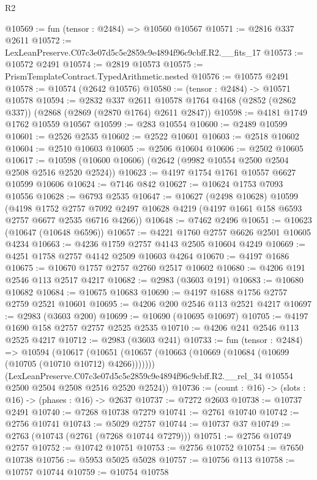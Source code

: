 \begin{lexlean}{R2}
\begin{coremodule}
@10569 := fun (tensor : @2484) => @10560 @10567
@10571 := @2816 @337 @2611
@10572 := LexLeanPreserve.C07c3e07d5c5e2859c9e4894f96c9cbff.R2.__fits_17
@10573 := @10572 @2491
@10574 := @2819 @10573
@10575 := PrismTemplateContract.TypedArithmetic.nested
@10576 := @10575 @2491
@10578 := @10574 (@2642 @10576)
@10580 := (tensor : @2484) -> @10571 @10578
@10594 := @2832
    @337
    @2611
    @10578
    @1764
    @4168
    (@2852 (@2862 @337))
    (@2868 (@2869 (@2870 @1764) @2611 @2847))
@10598 := @4181 @1749 @1762 @10559 @10567
@10599 := @283 @10554
@10600 := @2489 @10599
@10601 := @2526 @2535
@10602 := @2522 @10601
@10603 := @2518 @10602
@10604 := @2510 @10603
@10605 := @2506 @10604
@10606 := @2502 @10605
@10617 := @10598 (@10600 @10606) (@2642 (@9982 @10554 @2500 @2504 @2508 @2516 @2520 @2524))
@10623 := @4197 @1754 @1761 @10557 @6627 @10599 @10606
@10624 := @7146 @842
@10627 := @10624 @1753 @7093 @10556
@10628 := @6793 @2535
@10647 := @10627
    (@2498 @10628)
    @10599
    (@4198
      @1752
      @2757
      @7092
      @2497
      @10628
      @4219
      (@4197 @1661 @158 @6593 @2757 @6677 @2535 @6716 @4266))
@10648 := @7462 @2496
@10651 := @10623 (@10647 (@10648 @6596))
@10657 := @4221 @1760 @2757 @6626 @2501 @10605 @4234
@10663 := @4236 @1759 @2757 @4143 @2505 @10604 @4249
@10669 := @4251 @1758 @2757 @4142 @2509 @10603 @4264
@10670 := @4197 @1686
@10675 := @10670 @1757 @2757 @2760 @2517 @10602
@10680 := @4206 @191 @2546 @113 @2517 @4217
@10682 := @2983 (@3603 @191)
@10683 := @10680 @10682
@10684 := @10675 @10683
@10690 := @4197 @1688 @1756 @2757 @2759 @2521 @10601
@10695 := @4206 @200 @2546 @113 @2521 @4217
@10697 := @2983 (@3603 @200)
@10699 := @10690 (@10695 @10697)
@10705 := @4197 @1690 @158 @2757 @2757 @2525 @2535
@10710 := @4206 @241 @2546 @113 @2525 @4217
@10712 := @2983 (@3603 @241)
@10733 := fun (tensor : @2484) =>
  @10594
    (@10617
      (@10651 (@10657 (@10663 (@10669 (@10684 (@10699 (@10705 (@10710 @10712) @4266)))))))
      (LexLeanPreserve.C07c3e07d5c5e2859c9e4894f96c9cbff.R2.__rel_34
        @10554
        @2500
        @2504
        @2508
        @2516
        @2520
        @2524))
@10736 := (count : @16) -> (slots : @16) -> (phases : @16) -> @2637
@10737 := @7272 @2603
@10738 := @10737 @2491
@10740 := @7268 @10738 @7279
@10741 := @2761 @10740
@10742 := @2756 @10741
@10743 := @5029 @2757
@10744 := @10737 @37
@10749 := @2763 (@10743 (@2761 (@7268 @10744 @7279)))
@10751 := @2756 @10749 @2757
@10752 := @10742 @10751
@10753 := @2756 @10752
@10754 := @7650 @10738
@10756 := @5953 @5025 @5028
@10757 := @10756 @113
@10758 := @10757 @10744
@10759 := @10754 @10758

\end{coremodule}
\end{lexlean}
